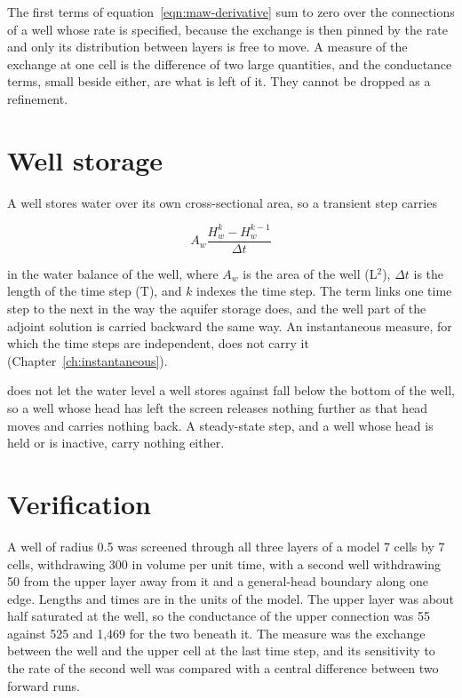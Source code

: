 The first terms of equation~\ref{eqn:maw-derivative} sum to zero over the connections of a well whose rate is specified, because the exchange is then pinned by the rate and only its distribution between layers is free to move. A measure of the exchange at one cell is the difference of two large quantities, and the conductance terms, small beside either, are what is left of it. They cannot be dropped as a refinement.

\section*{Well storage}

A well stores water over its own cross-sectional area, so a transient step carries

\begin{equation}
	\label{eqn:maw-storage}
	A_{w} \frac{H_{w}^{k} - H_{w}^{k-1}}{\Delta t}
\end{equation}

\noindent in the water balance of the well, where $A_{w}$ is the area of the well (L$^{2}$), $\Delta t$ is the length of the time step (T), and $k$ indexes the time step. The term links one time step to the next in the way the aquifer storage does, and the well part of the adjoint solution is carried backward the same way. An instantaneous measure, for which the time steps are independent, does not carry it (Chapter~\ref{ch:instantaneous}).

\mf{} does not let the water level a well stores against fall below the bottom of the well, so a well whose head has left the screen releases nothing further as that head moves and carries nothing back. A steady-state step, and a well whose head is held or is inactive, carry nothing either.

\section*{Verification}

A well of radius 0.5 was screened through all three layers of a model 7 cells by 7 cells, withdrawing 300 in volume per unit time, with a second well withdrawing 50 from the upper layer away from it and a general-head boundary along one edge. Lengths and times are in the units of the model. The upper layer was about half saturated at the well, so the conductance of the upper connection was 55 against 525 and 1{,}469 for the two beneath it. The measure was the exchange between the well and the upper cell at the last time step, and its sensitivity to the rate of the second well was compared with a central difference between two forward runs.

